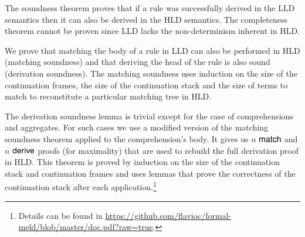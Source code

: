 The soundness theorem proves that if a rule was successfully derived in the LLD semantics then it can also be derived in the HLD semantics. The completeness theorem cannot
be proven since LLD lacks the non-determinism inherent in HLD.

We prove that matching the body of a rule in LLD can also be performed in HLD (matching soundness) and that deriving the head of the rule is also sound (derivation soundness). The matching soundness uses induction on the size of the continuation frames, the size of the continuation stack and the size of terms to match to reconstitute a particular matching tree in HLD.

The derivation soundness lemma is trivial except for the case of comprehensions and aggregates. For such cases we use a modified version of the matching soundness theorem applied to the comprehension's body. It gives us $n$ $\mathsf{match} \;$and $n$ $\mathsf{derive} \;$proofs (for maximality) that are used to rebuild the full derivation proof in HLD. This theorem is proved by
induction on the size of the continuation stack and continuation frames and uses lemmas that prove the correctness of the continuation stack after each application.\footnote{Details can be
found in \url{https://github.com/flavioc/formal-meld/blob/master/doc.pdf?raw=true}.}

